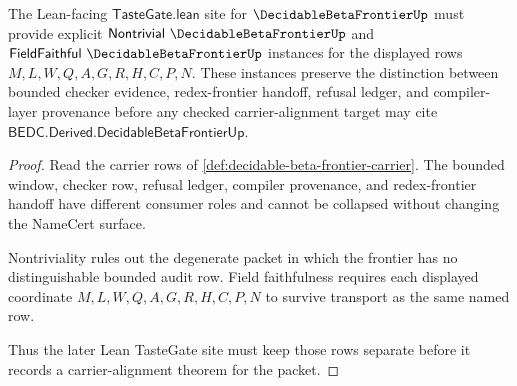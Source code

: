 \begin{theorem}
\label{thm:decidable-beta-frontier-tastegate-boundary}
The Lean-facing $\mathsf{TasteGate.lean}$ site for $\DecidableBetaFrontierUp$ must provide explicit $\mathsf{Nontrivial}\ \DecidableBetaFrontierUp$ and $\mathsf{FieldFaithful}\ \DecidableBetaFrontierUp$ instances for the displayed rows $M,L,W,Q,A,G,R,H,C,P,N$. These instances preserve the distinction between bounded checker evidence, redex-frontier handoff, refusal ledger, and compiler-layer provenance before any checked carrier-alignment target may cite $\mathsf{BEDC.Derived.DecidableBetaFrontierUp}$.
\end{theorem}
\begin{proof}
Read the carrier rows of \autoref{def:decidable-beta-frontier-carrier}. The bounded window, checker row, refusal ledger, compiler provenance, and redex-frontier handoff have different consumer roles and cannot be collapsed without changing the NameCert surface.

Nontriviality rules out the degenerate packet in which the frontier has no distinguishable bounded audit row. Field faithfulness requires each displayed coordinate $M,L,W,Q,A,G,R,H,C,P,N$ to survive transport as the same named row.

Thus the later Lean TasteGate site must keep those rows separate before it records a carrier-alignment theorem for the packet.
\end{proof}



